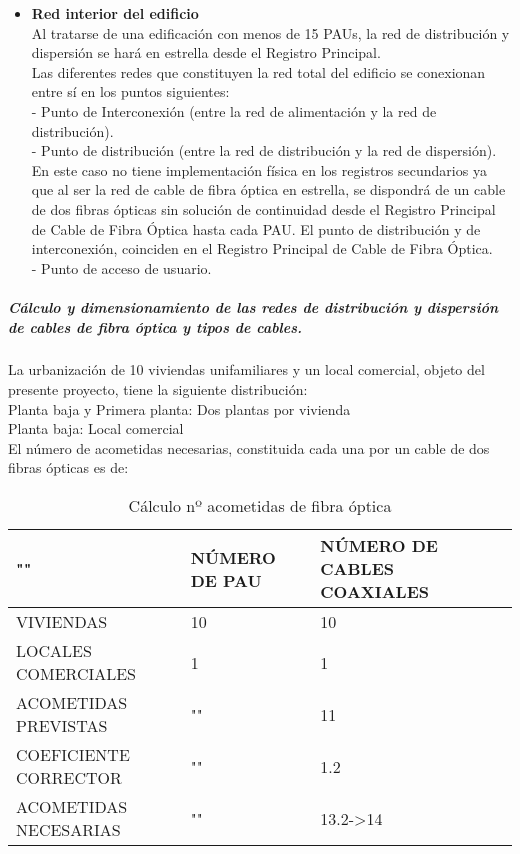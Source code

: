 \begin{itemize}
	\item \textbf{Red interior del edificio}\\
Al tratarse de una edificación con menos de 15 PAUs, la red de distribución y dispersión se hará
en estrella desde el Registro Principal.\\
Las diferentes redes que constituyen la red total del edificio se conexionan entre sí en los puntos
siguientes:\\
- Punto de Interconexión (entre la red de alimentación y la red de distribución).\\
- Punto de distribución (entre la red de distribución y la red de dispersión). En este caso no tiene
implementación física en los registros secundarios ya que al ser la red de cable de fibra óptica en
estrella, se dispondrá de un cable de dos fibras ópticas sin solución de continuidad desde el
Registro Principal de Cable de Fibra Óptica hasta cada PAU. El punto de distribución y de
interconexión, coinciden en el Registro Principal de Cable de Fibra Óptica.\\
- Punto de acceso de usuario.\\
\end{itemize}
\subparagraph{Cálculo y dimensionamiento de las redes de distribución y dispersión de cables de fibra óptica y tipos de cables.}
La urbanización de 10 viviendas unifamiliares y un local comercial, objeto del presente proyecto, tiene la siguiente distribución:\\
Planta baja y Primera planta:			Dos plantas por vivienda\\
Planta baja:							Local comercial\\
El número de acometidas necesarias, constituida cada una por un cable de dos fibras ópticas es de:
\begin{table}[H]
\centering
\begin{tabular}{|p{5cm} |p{5cm} |p{5cm}|}
\hline
""&NÚMERO DE PAU&NÚMERO DE CABLES COAXIALES \\
\hline \hline
VIVIENDAS&10&10\\
\hline
LOCALES COMERCIALES&1&1\\
\hline
ACOMETIDAS PREVISTAS&""&11\\
\hline
COEFICIENTE CORRECTOR&""&1.2\\
\hline
ACOMETIDAS NECESARIAS&""&13.2->14\\
\hline
\end{tabular}
\caption{Cálculo nº acometidas de fibra óptica}
\label{tabla:autores}
\end{table}
